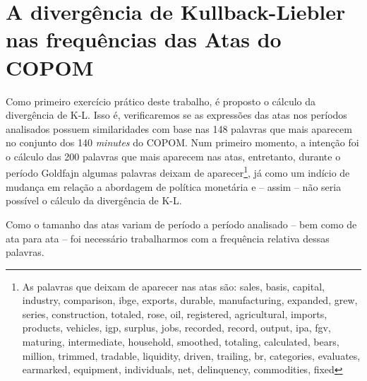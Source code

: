 \section{A divergência de Kullback-Liebler nas frequências das Atas do COPOM}

Como primeiro exercício prático deste trabalho, é proposto o cálculo da divergência de K-L. Isso é, verificaremos se as expressões das atas nos períodos analisados possuem similaridades com base nas 148 palavras que mais aparecem no conjunto dos 140 \textit{minutes} do COPOM. Num primeiro momento, a intenção foi o cálculo das 200 palavras que mais aparecem nas atas, entretanto, durante o período Goldfajn algumas palavras deixam de aparecer\footnote{As palavras que deixam de aparecer nas atas são: sales, basis, capital, industry, comparison, ibge, exports, durable, manufacturing, expanded, grew, series, construction, totaled, rose, oil, registered, agricultural, imports, products, vehicles, igp, surplus, jobs, recorded, record, output, ipa, fgv, maturing, intermediate, household, smoothed, totaling, calculated, bears, million, trimmed, tradable, liquidity, driven, trailing, br, categories, evaluates, earmarked, equipment, individuals, net, delinquency, commodities, fixed}, já como um indício de mudança em relação a abordagem de política monetária e -- assim -- não seria possível o cálculo da divergência de K-L. 

Como o tamanho das atas variam de período a período analisado -- bem como de ata para ata -- foi necessário trabalharmos com a frequência relativa dessas palavras.



